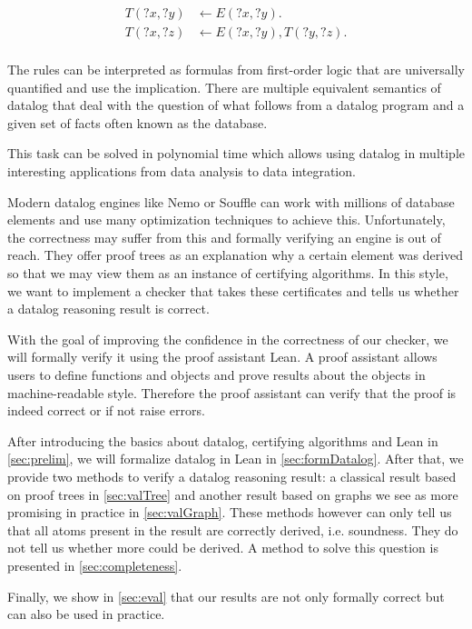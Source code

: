 \begin{equation}
    \begin{split}
        T(?x, ?y) &\leftarrow E(?x, ?y). \\
        T(?x, ?z) &\leftarrow E(?x, ?y), T(?y, ?z). \\
    \end{split}
\end{equation}

The rules can be interpreted as formulas from first-order logic that are universally quantified and use the implication. There are multiple equivalent semantics of datalog that deal with the question of what follows from a datalog program and a given set of facts often known as the database.

This task can be solved in polynomial time which allows using datalog in multiple interesting applications from data analysis to data integration.

Modern datalog engines like Nemo\cite{Nemo} or Souffle\cite{Souffle} can work with millions of database elements and use many optimization techniques to achieve this. Unfortunately, the correctness may suffer from this and formally verifying an engine is out of reach. They offer proof trees as an explanation why a certain element was derived so that we may view them as an instance of certifying algorithms. In this style, we want to implement a checker that takes these certificates and tells us whether a datalog reasoning result is correct.

With the goal of improving the confidence in the correctness of our checker, we will formally verify it using the proof assistant Lean\cite{Lean4}. A proof assistant allows users to define functions and objects and prove results about the objects in machine-readable style. Therefore the proof assistant can verify that the proof is indeed correct or if not raise errors.

After introducing the basics about datalog, certifying algorithms and Lean in \cref{sec:prelim}, we will formalize datalog in Lean in \cref{sec:formDatalog}. After that, we provide two methods to verify a datalog reasoning result: a classical result based on proof trees in \cref{sec:valTree} and another result based on graphs we see as more promising in practice in \cref{sec:valGraph}. 
These methods however can only tell us that all atoms present in the result are correctly derived, i.e. soundness. They do not tell us whether more could be derived. A method to solve this question is presented in \cref{sec:completeness}.

Finally, we show in \cref{sec:eval} that our results are not only formally correct but can also be used in practice.